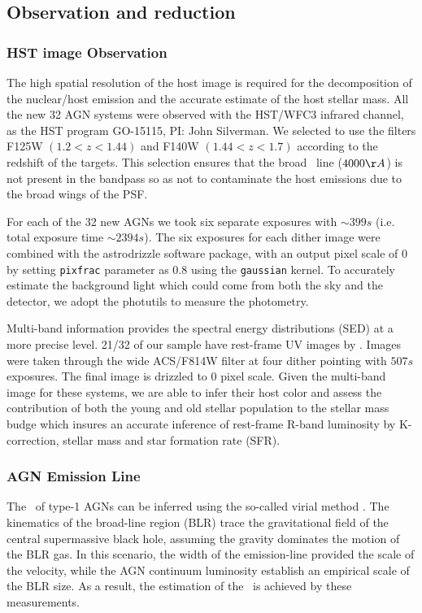 \documentclass[apj]{emulateapj}
\begin{document}
\subsection{Observation and reduction}
\label{observation}
\subsubsection{HST image Observation}
The high spatial resolution of the host image is required for the decomposition of the nuclear/host emission and the accurate estimate of the host stellar mass. All the new 32 AGN systems were observed with the HST/WFC3 infrared channel, as the HST program GO-15115, PI: John Silverman. We selected to use the filters F125W $(1.2<z<1.44)$ and F140W $(1.44<z<1.7)$ according to the redshift of the targets. This selection ensures that the broad \halpha\ line ($4000\AA$) is not present in the bandpass so as not to contaminate the host emissions due to the broad wings of the PSF.

For each of the 32 new AGNs we took six separate exposures with $\sim399s$ (i.e. total exposure time $\sim2394s$). The six exposures for each dither image were combined with the {\sc astrodrizzle} software package, with an output pixel scale of 0 by setting \texttt{pixfrac} parameter as 0.8 using the \texttt{gaussian} kernel. 
To accurately estimate the background light which could come from both the sky and the detector, we adopt the {\sc photutils} to measure the photometry.

Multi-band information provides the spectral energy distributions (SED) at a more precise level. 21/32 of our sample have rest-frame UV images by \citet{Scoville2007}. Images were taken through the wide ACS/F814W filter at four dither pointing with $507s$ exposures. The final image is drizzled to 0 pixel scale. Given the multi-band image for these systems, we are able to infer their host color and assess the contribution of both the young and old stellar population to the stellar mass budge \citet{Gallazzi2009} which insures an accurate inference of rest-frame R-band luminosity by K-correction, stellar mass and star formation rate (SFR). 

\subsubsection{AGN Emission Line}
\label{sec:bh_mass}
The \mbh\ of type-1 AGNs can be inferred using the so-called virial method \citep{Peterson2004, Shen2013}. The kinematics of the broad-line region (BLR) trace the gravitational field of the central supermassive black hole, assuming the gravity dominates the motion of the BLR gas. In this scenario, the width of the emission-line provided the scale of the velocity, while the AGN continuum luminosity establish an empirical scale of the BLR size. As a result, the estimation of the \mbh\ is achieved by these measurements.
\end{document}
